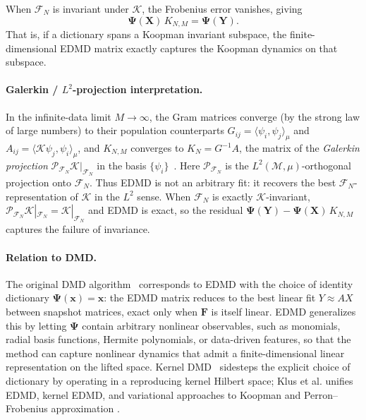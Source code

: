 \documentclass{article}
\theoremstyle{plain}
\theoremstyle{definition}
\def\X{\mathbf{X}}
\def\x{\mathbf{x}}
\def\Y{\mathbf{Y}}
\def\Koop{\mathcal{K}}
\def\Fc{\mathcal{F}}
\def\Mc{\mathcal{M}}
\newcommand{\arXivtag}[1][]{#1}
\begin{document}
When $\Fc_N$ is invariant under $\Koop$, the Frobenius error vanishes, giving
\begin{equation}\label{eq:KpsiX-psiY}
	\mathbf{\Psi}(\X)\,K_{N,M} = \mathbf{\Psi}(\Y).
\end{equation}
That is, if a dictionary spans a Koopman invariant subspace, the finite-dimensional EDMD matrix exactly captures the Koopman dynamics on that subspace.

\paragraph{Galerkin / $L^2$-projection interpretation.}
In the infinite-data limit $M\to\infty$, the Gram matrices converge (by the strong law of large numbers) to their population counterparts $G_{ij} = \langle \psi_i, \psi_j\rangle_\mu$ and $A_{ij} = \langle \Koop\psi_j, \psi_i\rangle_\mu$, and $K_{N,M}$ converges to $K_N = G^{-1}A$, the matrix of the \emph{Galerkin projection} $\mathcal{P}_{\Fc_N}\Koop|_{\Fc_N}$ in the basis $\{\psi_i\}$~\cite{korda2018convergence}. Here $\mathcal{P}_{\Fc_N}$ is the $L^2(\Mc,\mu)$-orthogonal projection onto $\Fc_N$. Thus EDMD is not an arbitrary fit: it recovers the best $\Fc_N$-representation of $\Koop$ in the $L^2$ sense. When $\Fc_N$ is exactly $\Koop$-invariant, $\mathcal{P}_{\Fc_N}\Koop|_{\Fc_N} = \Koop|_{\Fc_N}$ and EDMD is exact, so the residual $\mathbf{\Psi}(\Y) - \mathbf{\Psi}(\X)\,K_{N,M}$ captures the failure of invariance.

\paragraph{Relation to DMD.}
The original DMD algorithm~\cite{schmid2010dynamic,rowley2009spectral,kutz2016dynamic} corresponds to \arXivtag[EDMD with] the choice of identity dictionary $\mathbf{\Psi}(\x) = \x$: the EDMD matrix reduces to the best linear fit $Y \approx AX$ between snapshot matrices, exact only when $\mathbf{F}$ is itself linear. EDMD generalizes this by letting $\mathbf{\Psi}$ contain arbitrary nonlinear observables, such as monomials, radial basis functions, Hermite polynomials, or data-driven features, so that the method can capture nonlinear dynamics that admit a finite-dimensional linear representation on the lifted space. Kernel DMD~\cite{kevrekidis2016kernel} sidesteps the explicit choice of dictionary by operating in a reproducing kernel Hilbert space; \arXivtag[Klus et al.] unifies EDMD, kernel EDMD, and variational approaches to Koopman and Perron--Frobenius approximation \cite{Klus2016JCompDyn}.
\end{document}

